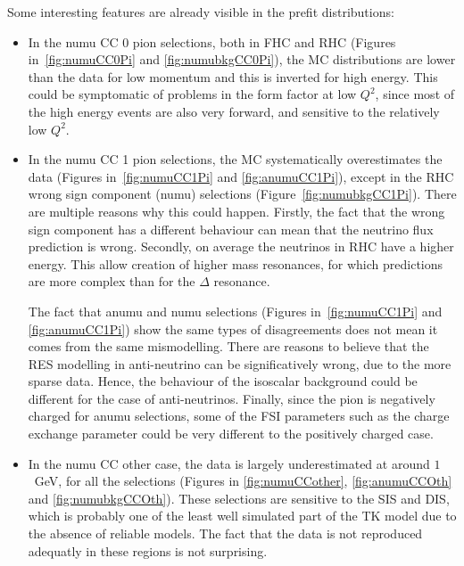 Some interesting features are already visible in the prefit
distributions:
\begin{itemize}[noitemsep,topsep=0pt]
\item In the \Gls{numu} \Gls{CC} 0 pion selections, both in \Gls{FHC}
  and \Gls{RHC} (Figures in~\ref{fig:numuCC0Pi} and
  \ref{fig:numubkgCC0Pi}), the \Gls{MC} distributions are lower than
  the data for low momentum and this is inverted for high energy. This
  could be symptomatic of problems in the form factor at low $Q^2$,
  since most of the high energy events are also very forward, and
  sensitive to the relatively low $Q^2$.
\item In the \Gls{numu} \Gls{CC} 1 pion selections, the \Gls{MC}
  systematically overestimates the data (Figures
  in~\ref{fig:numuCC1Pi} and \ref{fig:anumuCC1Pi}), except in the
  \Gls{RHC} wrong sign component (\Gls{numu}) selections
  (Figure~\ref{fig:numubkgCC1Pi}). There are multiple reasons why this
  could happen. Firstly, the fact that the wrong sign component has a
  different behaviour can mean that the neutrino flux prediction is
  wrong. Secondly, on average the neutrinos in \Gls{RHC} have a higher
  energy. This allow creation of higher mass resonances, for which
  predictions are more complex than for the $\Delta$ resonance.

  The fact that \Gls{anumu} and \Gls{numu} selections (Figures
  in~\ref{fig:numuCC1Pi} and \ref{fig:anumuCC1Pi}) show the same types
  of disagreements does not mean it comes from the same
  mismodelling. There are reasons to believe that the \Gls{RES}
  modelling in anti-neutrino can be significatively wrong, due to the
  more sparse data. Hence, the behaviour of the isoscalar background
  could be different for the case of anti-neutrinos. Finally, since
  the pion is negatively charged for \Gls{anumu} selections, some of
  the \Gls{FSI} parameters such as the charge exchange parameter could
  be very different to the positively charged case.
\item In the \Gls{numu} \Gls{CC} other case, the data is largely
  underestimated at around $1$~GeV, for all the selections (Figures in
  \ref{fig:numuCCother}, \ref{fig:anumuCCOth} and
  \ref{fig:numubkgCCOth}). These selections are sensitive to the
  \Gls{SIS} and \Gls{DIS}, which is probably one of the least well
  simulated part of the \Gls{TK} model due to the absence of reliable
  models. The fact that the data is not reproduced adequatly in these
  regions is not surprising.
\end{itemize}


